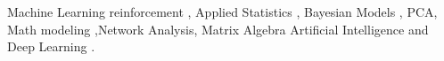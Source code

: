 

\begin{cvparagraph}
Machine Learning reinforcement , Applied Statistics , Bayesian Models , PCA, Math modeling ,Network Analysis, Matrix Algebra Artificial Intelligence and Deep Learning .

\end{cvparagraph}